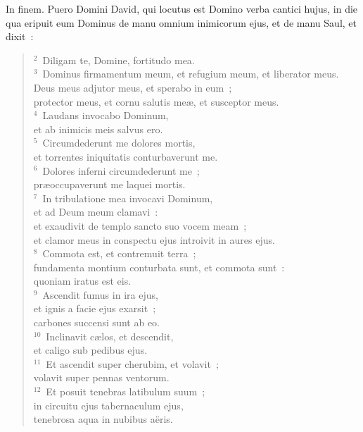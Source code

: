 


\bchapter
\lettrine[lines=3,image=true,loversize=0.05,lraise=-0.03]{I}{}n finem. Puero Domini David, qui locutus est Domino verba cantici hujus, in die qua eripuit eum Dominus de manu omnium inimicorum ejus, et de manu Saul, et dixit~:
\begin{flushleft}\begin{verse}\vspace{6pt}${}^{2}$~Diligam te, Domine, fortitudo mea.\\
${}^{3}$~Dominus firmamentum meum, et refugium meum, et liberator meus.\\ Deus meus adjutor meus, et sperabo in eum~;\\ protector meus, et cornu salutis me\ae , et susceptor meus.\\
${}^{4}$~Laudans invocabo Dominum,\\ et ab inimicis meis salvus ero.\\
${}^{5}$~Circumdederunt me dolores mortis,\\ et torrentes iniquitatis conturbaverunt me.\\
${}^{6}$~Dolores inferni circumdederunt me~;\\ pr\ae occupaverunt me laquei mortis.\\
${}^{7}$~In tribulatione mea invocavi Dominum,\\ et ad Deum meum clamavi~:\\ et exaudivit de templo sancto suo vocem meam~;\\ et clamor meus in conspectu ejus introivit in aures ejus.\\
${}^{8}$~Commota est, et contremuit terra~;\\ fundamenta montium conturbata sunt, et commota sunt~:\\ quoniam iratus est eis.\\
${}^{9}$~Ascendit fumus in ira ejus,\\ et ignis a facie ejus exarsit~;\\ carbones succensi sunt ab eo.\\
${}^{10}$~Inclinavit c\ae los, et descendit,\\ et caligo sub pedibus ejus.\\
${}^{11}$~Et ascendit super cherubim, et volavit~;\\ volavit super pennas ventorum.\\
${}^{12}$~Et posuit tenebras latibulum suum~;\\ in circuitu ejus tabernaculum ejus,\\ tenebrosa aqua in nubibus a\"eris.\\

\end{verse}
\end{flushleft}
